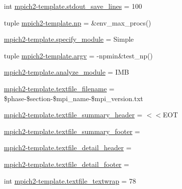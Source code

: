 \begin{DoxyCompactItemize}
\item 
int \hyperlink{namespacempich2-template_af6c50bb5f1dbba22780519e1035267d5}{mpich2-\/template.\-stdout\-\_\-save\-\_\-lines} = 100
\item 
tuple \hyperlink{namespacempich2-template_a1e4ef87053b35546931a526e5b33730f}{mpich2-\/template.\-np} = \&env\-\_\-max\-\_\-procs()
\item 
\hyperlink{namespacempich2-template_a3dc27698e45451e7a109f66bbeddd7bf}{mpich2-\/template.\-specify\-\_\-module} = Simple
\item 
tuple \hyperlink{namespacempich2-template_a972eb3916865e55f4447ff22844a3516}{mpich2-\/template.\-argv} = -\/npmin\&test\-\_\-np()
\item 
\hyperlink{namespacempich2-template_a4cc2a66d5339408c4f8416c5517db7ee}{mpich2-\/template.\-analyze\-\_\-module} = I\-M\-B
\item 
\hyperlink{namespacempich2-template_a710555fb93fb871c9931af62b3489828}{mpich2-\/template.\-textfile\-\_\-filename} = \$phase-\/\$section-\/\$mpi\-\_\-name-\/\$mpi\-\_\-version.\-txt
\item 
\hyperlink{namespacempich2-template_a6ce48ad896563c19dd5bcd15b12281ed}{mpich2-\/template.\-textfile\-\_\-summary\-\_\-header} = $<$$<$E\-O\-T
\item 
\hyperlink{namespacempich2-template_abacd11351989cd5c1a4b3450410d1cd3}{mpich2-\/template.\-textfile\-\_\-summary\-\_\-footer} =
\item 
\hyperlink{namespacempich2-template_a6d17bd61d7c5a8f4180328a9463887d5}{mpich2-\/template.\-textfile\-\_\-detail\-\_\-header} =
\item 
\hyperlink{namespacempich2-template_acc3253311ae65af2f39f6720e10f760f}{mpich2-\/template.\-textfile\-\_\-detail\-\_\-footer} =
\item 
int \hyperlink{namespacempich2-template_a5eaa982dec46f6f6403987ff0de1e6ae}{mpich2-\/template.\-textfile\-\_\-textwrap} = 78
\end{DoxyCompactItemize}
